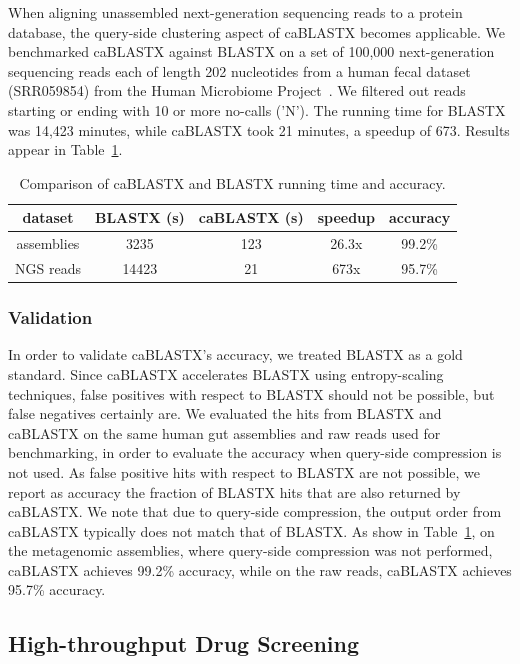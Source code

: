 \documentclass[review,preprint,12pt]{elsarticle}
\renewcommand{\cite}{\citep} %
\theoremstyle{definition}
\theoremstyle{remark}
\numberwithin{equation}{section}
\begin{document}
When aligning unassembled next-generation sequencing reads to a protein 
database, the
query-side clustering aspect of caBLASTX becomes applicable.
We benchmarked caBLASTX against BLASTX on a set of 100,000
next-generation sequencing reads each of length 202 nucleotides from a human 
fecal dataset (SRR059854) from the
Human Microbiome Project~\cite{turnbaugh2007human}.
We filtered out reads starting or ending with 10 or more no-calls ('N').
The running time for BLASTX was 14,423 minutes, 
while caBLASTX took 21 minutes, a speedup of 673.
Results appear in Table~\ref{mgbench}.

\begin{table}
\caption{Comparison of caBLASTX and BLASTX running time and accuracy.\label{mgbench}}
\begin{tabular}{ccccc}
\hline
dataset & BLASTX (s) & caBLASTX  (s) & speedup & accuracy\\
\hline
assemblies & 3235 & 123 & 26.3x & 99.2\%\\
\hline
NGS reads & 14423 & 21 & 673x & 95.7\%\\
\hline
\end{tabular}
\end{table}



\subsubsection{Validation}

In order to validate caBLASTX's accuracy, we treated BLASTX as a gold standard. 
Since caBLASTX accelerates BLASTX
using entropy-scaling techniques, false positives with respect to BLASTX should 
not be possible, but false negatives certainly are.
We evaluated the hits from BLASTX and caBLASTX on the same human gut
assemblies and raw reads used for benchmarking, in order to evaluate the accuracy when
query-side compression is not used.
As false positive hits with respect to BLASTX are not possible, we report as 
accuracy the fraction of BLASTX hits that are also returned by caBLASTX.
We note that due to query-side compression, the output order from caBLASTX 
typically does not match that of BLASTX.
As show in Table~\ref{mgbench}, on the metagenomic assemblies, where query-side 
compression was not performed, caBLASTX achieves 99.2\% accuracy, while on the 
raw reads, caBLASTX achieves 95.7\% accuracy.


\subsection{High-throughput Drug Screening}
\end{document}
